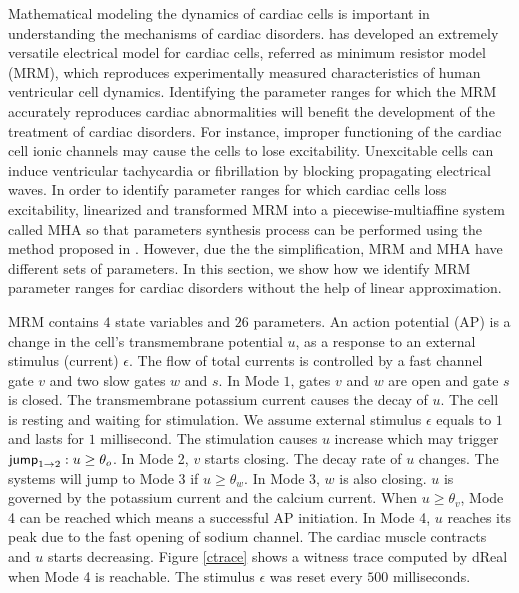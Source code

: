 Mathematical modeling the dynamics of cardiac cells is important in understanding the mechanisms of cardiac disorders. \cite{orovio08} has developed an extremely versatile electrical model for cardiac cells, referred as minimum resistor model (MRM), which reproduces experimentally measured characteristics of human ventricular cell dynamics. Identifying the parameter ranges for which the MRM accurately reproduces cardiac abnormalities will benefit the development of the treatment of cardiac disorders. For instance, improper functioning of the cardiac cell ionic channels may cause the cells to lose excitability. Unexcitable cells can induce ventricular tachycardia or fibrillation by blocking propagating electrical waves. In order to identify parameter ranges for which cardiac cells loss excitability, \cite{grosu11} linearized and transformed MRM into a piecewise-multiaffine system called MHA so that parameters synthesis process can be performed using the method proposed in \cite{rovergene}. However, due the the simplification, MRM and MHA have different sets of parameters. In this section, we show how we identify MRM parameter ranges for cardiac disorders without the help of linear approximation.



MRM contains $4$ state variables and $26$ parameters. An action potential (AP) is a change in the cell's transmembrane potential $u$, as a response to an external stimulus (current) $\epsilon$. The flow of total currents is controlled by a fast channel gate $v$ and two slow gates $w$ and $s$. %
%
%
%
In Mode $1$, gates $v$ and $w$ are open and gate $s$ is closed. The transmembrane potassium current causes the decay of $u$. The cell is resting and waiting for stimulation. We assume external stimulus $\epsilon$ equals to $1$ and lasts for $1$ millisecond. The stimulation causes $u$ increase which may trigger $\mathsf{jump}_{1 \rightarrow 2}: u \geq \theta_o$. In Mode 2, $v$ starts closing. The decay rate of $u$ changes. The systems will jump to Mode 3 if $u \geq \theta_w$. In Mode 3, $w$ is also closing. $u$ is governed by the potassium current and the calcium current. When $u \geq \theta_v$, Mode 4 can be reached which means a successful AP initiation. In Mode 4, $u$ reaches its peak due to the fast opening of sodium channel. The cardiac muscle contracts and $u$ starts decreasing. Figure \ref{ctrace} shows a witness trace computed by dReal when Mode 4 is reachable. The stimulus $\epsilon$ was reset every $500$ milliseconds.







